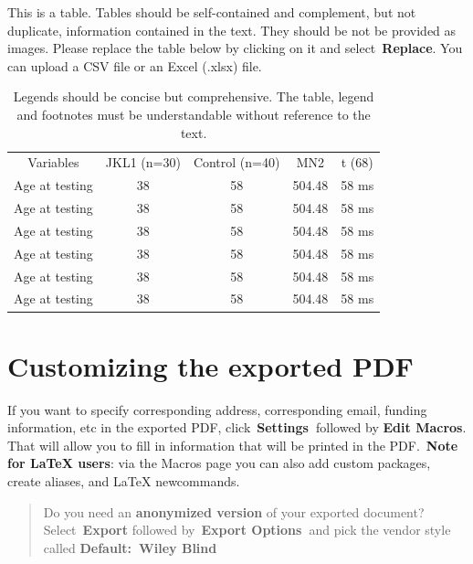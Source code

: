 \documentclass[alpha-refs]{wiley-article}
\begin{document}
This is a table. Tables should be self-contained and complement, but not
duplicate, information contained in the text. They should be not be
provided as images. Please replace the table below by clicking on it and
select~\textbf{Replace}. You can upload a CSV file or an Excel (.xlsx)
file.~
\begin{table}[h!]
\centering
\normalsize\begin{tabulary}{1.0\textwidth}{CCCCC}
Variables & JKL1 (n=30) & Control (n=40) & MN2 & t (68) \\
Age at testing & 38 & 58 & 504.48 & 58 ms \\
Age at testing & 38 & 58 & 504.48 & 58 ms \\
Age at testing & 38 & 58 & 504.48 & 58 ms \\
Age at testing & 38 & 58 & 504.48 & 58 ms \\
Age at testing & 38 & 58 & 504.48 & 58 ms \\
Age at testing & 38 & 58 & 504.48 & 58 ms \\
\end{tabulary}
\caption{{Legends should be concise but comprehensive. The table, legend and
footnotes must be understandable without reference to the text.
{\label{536540}}%
}}
\end{table}

\section*{Customizing the exported
PDF}

{\label{614641}}

If you want to specify corresponding address, corresponding email,
funding information, etc in the exported PDF,
click~\textbf{Settings~}followed by \textbf{Edit Macros}. That will
allow you to fill in information that will be printed in the
PDF.~\textbf{Note for LaTeX users}: via the Macros page you can also add
custom packages, create aliases, and LaTeX newcommands.

\begin{quote}
Do you need an \textbf{anonymized version} of your exported document?
Select~\textbf{Export} followed by~\textbf{Export Options~}and pick the
vendor style called \textbf{Default:~Wiley Blind}~
\end{quote}

\par\null

\FloatBarrier

\end{document}
